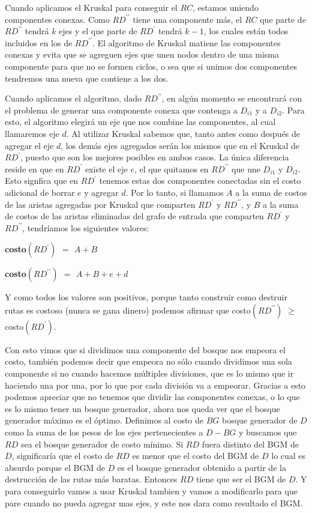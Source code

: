 Cuando aplicamos el Kruskal para conseguir el $RC$, estamos uniendo componentes conexas. Como $RD^{\prime\prime}$ tiene una componente más, el $RC$ que parte de $RD^{\prime\prime}$ tendrá $k$ ejes y el que parte de $RD^{\prime}$ tendrá $k-1$, los cuales están todos incluidos en los de $RD^{\prime\prime}$. El algoritmo de Kruskal matiene las componentes conexas y evita que se agreguen ejes que unen nodos dentro de una misma componente para que no se formen ciclos, o sea que si unimos dos componentes tendremos una nueva que contiene a los dos.

Cuando aplicamos el algoritmo, dado $RD^{\prime\prime}$, en algún momento se encontrará con el problema de generar una componente conexa que contenga a $D_{i1}$  y a $D_{i2}$. Para esto, el algoritmo elegirá un eje que nos combine las componentes, al cual llamaremos eje $d$. Al utilizar Kruskal sabemos que, tanto antes como después de agregar el eje $d$, los demás ejes agregados serán los mismos que en el Kruskal de $RD^{\prime}$, puesto que son los mejores posibles en ambos casos. La única diferencia reside en que en $RD^{\prime}$ existe el eje $e$, el que quitamos en $RD^{\prime\prime}$ que une $D_{i1}$ y $D_{i2}$. Esto signfica que en $RD^{\prime}$ tenemos estas dos componentes conectadas sin el costo adicional de borrar $e$ y agregar $d$. Por lo tanto, si llamamos $A$ a la suma de costos de las aristas agregadas por Kruskal que comparten $RD^{\prime}$ y $RD^{\prime\prime}$, y $B$ a la suma de costos de las aristas eliminadas del grafo de entrada que comparten $RD^{\prime}$ y $RD^{\prime\prime}$, tendríamos los siguientes valores:

\begin{center}
	\textbf{costo$(RD^{\prime})$ $=$ $A + B$}

	\textbf{costo$(RD^{\prime\prime})$ $=$ $A + B + e + d$}
	
\end{center}

Y como todos los valores son positivos, porque tanto construir como destruir rutas es costoso (nunca se gana dinero) podemos afirmar que
costo$(RD^{\prime\prime})$ $\geq$ costo$(RD^{\prime})$.

Con esto vimos que si dividimos una componente del bosque nos empeora el costo, también podemos decir que empeora no sólo cuando dividimos una sola componente si no cuando hacemos múltiples divisiones, que es lo mismo que ir haciendo una por una, por lo que por cada división va a empeorar. Gracias a esto podemos apreciar que no tenemos que dividir las componentes conexas, o lo que es lo mismo tener un bosque generador, ahora nos queda ver que el bosque generador máximo es el óptimo. Definimos al costo de $BG$ bosque generador de $D$  como la suma de los pesos de los ejes pertenecientes a $D - BG$ y buscamos que $RD$ sea el bosque generador de costo mínimo. Si $RD$ fuera distinto del BGM de $D$, significaría que el costo de $RD$ es menor que el costo del BGM de $D$ lo cual es absurdo porque el BGM de $D$ es el bosque generador obtenido a partir de la destrucción de las rutas más baratas. Entonces $RD$ tiene que ser el BGM de $D$. Y para conseguirlo vamos a usar Kruskal tambien y vamos a modificarlo para que pare cuando no pueda agregar mas ejes, y este nos dara como resultado el BGM.


